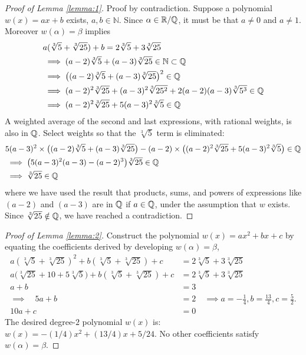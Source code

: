\begin{proof}[Proof of Lemma \ref{lemma:1}]
Proof by contradiction. Suppose a polynomial $w(x)=ax+b$ exists, $a,b\in\mathbb{N}$. Since $\alpha\in\mathbb{R}/\mathbb{Q}$, it must be that $a\ne0$ and $a\ne1$. Moreover $w(\alpha)=\beta$ implies
\begin{align*}
&
a (\sqrt[3]{5}+\sqrt[3]{25}) + b
= 2\sqrt[3]{5}+3\sqrt[3]{25}
\\
& \implies
(a-2)\sqrt[3]{5} + (a-3)\sqrt[3]{25} 
\in \mathbb{N} \subset \mathbb{Q}
\\
& \implies
\bigl((a-2)\sqrt[3]{5} + (a-3)\sqrt[3]{25}\bigr)^{2}
\in \mathbb{Q}
\\
& \implies
(a-2)^{2}\sqrt[3]{25} + (a-3)^{2}\sqrt[3]{25^{2}} + 2(a-2)(a-3)\sqrt[3]{5^{3}} 
\in \mathbb{Q}
\\
& \implies
(a-2)^{2}\sqrt[3]{25} + 5(a-3)^{2}\sqrt[3]{5} 
\in \mathbb{Q}
\end{align*}
A weighted average of the second and last expressions, with rational weights, is also in $\mathbb{Q}$. Select weights so that the $\sqrt[3]{5}$ term is eliminated:
\begin{align*}
&
5(a-3)^{2} \times 
\bigl((a-2)\sqrt[3]{5} + (a-3)\sqrt[3]{25}\bigr)
-
(a-2) \times
\bigl((a-2)^{2}\sqrt[3]{25} + 5(a-3)^{2}\sqrt[3]{5}\bigr)
\in \mathbb{Q}
\\
& \implies
\bigl(5(a-3)^{2}(a-3) - (a-2)^{3}\bigr)\sqrt[3]{25}
\in \mathbb{Q}
\\
& \implies
\sqrt[3]{25}
\in \mathbb{Q}
\end{align*}
where we have used the result that products, sums, and powers of expressions like $(a-2)$ and $(a-3)$ are in $\mathbb{Q}$ if $a\in\mathbb{Q}$, under the assumption that $w$ exists. Since $\sqrt[3]{25}\notin\mathbb{Q}$, we have reached a contradiction.
\end{proof}

\begin{proof}[Proof of Lemma \ref{lemma:2}]
Construct the polynomial $w(x)=ax^{2}+bx+c$ by equating the coefficients derived by developing $w(\alpha)=\beta$,
\begin{align*}
a (\sqrt[3]{5}+\sqrt[3]{25})^{2} + b (\sqrt[3]{5}+\sqrt[3]{25}) + c
& = 2\sqrt[3]{5} + 3\sqrt[3]{25}
\\[1ex]
a \bigl(\sqrt[3]{25} + 10 + 5\sqrt[3]{5}\bigr)
+ b (\sqrt[3]{5}+\sqrt[3]{25}) + c
& = 2\sqrt[3]{5} + 3\sqrt[3]{25}
\\
a + b
& = 3
\\ 
\implies \quad
5a + b
& = 2
\quad \implies 
a = -\frac{1}{4}, 
b = \frac{13}{4}, 
c = \frac{5}{2}.
\\ 
10a + c
& = 0
\end{align*}
The desired degree-$2$ polynomial $w(x)$ is: $w(x)=-(1/4)x^{2}+(13/4)x+5/24$. No other coefficients satisfy $w(\alpha)=\beta$.
\end{proof}


